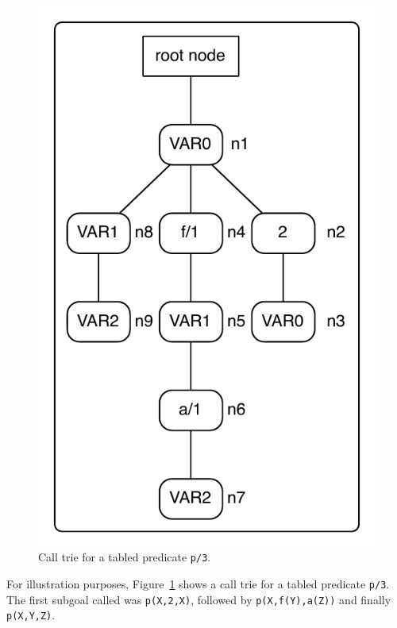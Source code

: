 \begin{figure}[ht]
  \centering
    \includegraphics[scale=0.6]{sub_call_search.pdf}
  \caption{Call trie for a tabled predicate \texttt{p/3}.}
  \label{fig:sub_call_search}
\end{figure}

For illustration purposes, Figure~\ref{fig:sub_call_search} shows a call trie for a tabled predicate \texttt{p/3}.
The first subgoal called was \texttt{p(X,2,X)}, followed by \texttt{p(X,f(Y),a(Z))} and finally \texttt{p(X,Y,Z)}.

